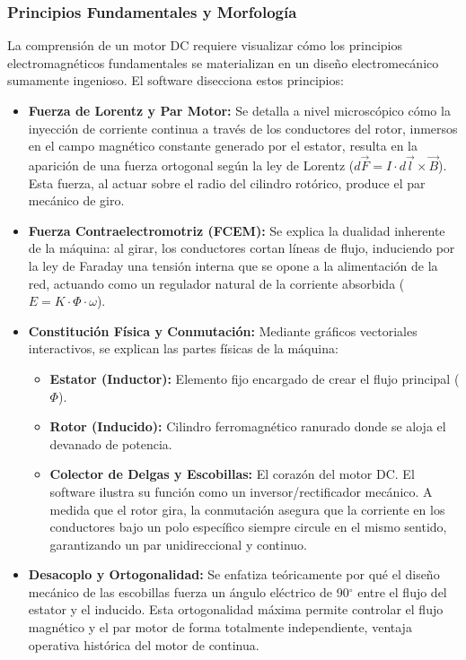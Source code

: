 \documentclass[11pt,a4paper]{article}
\begin{document}
\subsubsection{Principios Fundamentales y Morfología}
La comprensión de un motor DC requiere visualizar cómo los principios electromagnéticos fundamentales se materializan en un diseño electromecánico sumamente ingenioso. El software disecciona estos principios:
\begin{itemize}
    \item \textbf{Fuerza de Lorentz y Par Motor:} Se detalla a nivel microscópico cómo la inyección de corriente continua a través de los conductores del rotor, inmersos en el campo magnético constante generado por el estator, resulta en la aparición de una fuerza ortogonal según la ley de Lorentz ($d\vec{F} = I \cdot d\vec{l} \times \vec{B}$). Esta fuerza, al actuar sobre el radio del cilindro rotórico, produce el par mecánico de giro.
    \item \textbf{Fuerza Contraelectromotriz (FCEM):} Se explica la dualidad inherente de la máquina: al girar, los conductores cortan líneas de flujo, induciendo por la ley de Faraday una tensión interna que se opone a la alimentación de la red, actuando como un regulador natural de la corriente absorbida ($E = K \cdot \Phi \cdot \omega$).
    \item \textbf{Constitución Física y Conmutación:} Mediante gráficos vectoriales interactivos, se explican las partes físicas de la máquina:
    \begin{itemize}
        \item \textbf{Estator (Inductor):} Elemento fijo encargado de crear el flujo principal ($\Phi$).
        \item \textbf{Rotor (Inducido):} Cilindro ferromagnético ranurado donde se aloja el devanado de potencia.
        \item \textbf{Colector de Delgas y Escobillas:} El corazón del motor DC. El software ilustra su función como un inversor/rectificador mecánico. A medida que el rotor gira, la conmutación asegura que la corriente en los conductores bajo un polo específico siempre circule en el mismo sentido, garantizando un par unidireccional y continuo.
    \end{itemize}
    \item \textbf{Desacoplo y Ortogonalidad:} Se enfatiza teóricamente por qué el diseño mecánico de las escobillas fuerza un ángulo eléctrico de 90$^\circ$ entre el flujo del estator y el inducido. Esta ortogonalidad máxima permite controlar el flujo magnético y el par motor de forma totalmente independiente, ventaja operativa histórica del motor de continua.
\end{itemize}
\end{document}
